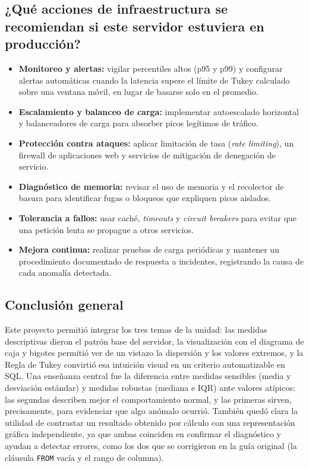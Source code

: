 \documentclass[12pt,letterpaper]{article}
\begin{document}
\subsection{¿Qué acciones de infraestructura se recomiendan si este servidor estuviera en producción?}
\begin{itemize}
    \item \textbf{Monitoreo y alertas:} vigilar percentiles altos (p95 y p99) y configurar alertas automáticas cuando la latencia supere el límite de Tukey calculado sobre una ventana móvil, en lugar de basarse solo en el promedio.
    \item \textbf{Escalamiento y balanceo de carga:} implementar autoescalado horizontal y balanceadores de carga para absorber picos legítimos de tráfico.
    \item \textbf{Protección contra ataques:} aplicar limitación de tasa (\textit{rate limiting}), un firewall de aplicaciones web y servicios de mitigación de denegación de servicio.
    \item \textbf{Diagnóstico de memoria:} revisar el uso de memoria y el recolector de basura para identificar fugas o bloqueos que expliquen picos aislados.
    \item \textbf{Tolerancia a fallos:} usar caché, \textit{timeouts} y \textit{circuit breakers} para evitar que una petición lenta se propague a otros servicios.
    \item \textbf{Mejora continua:} realizar pruebas de carga periódicas y mantener un procedimiento documentado de respuesta a incidentes, registrando la causa de cada anomalía detectada.
\end{itemize}
 
\subsection{Conclusión general}
Este proyecto permitió integrar los tres temas de la unidad: las medidas descriptivas dieron el patrón base del servidor, la visualización con el diagrama de caja y bigotes permitió ver de un vistazo la dispersión y los valores extremos, y la Regla de Tukey convirtió esa intuición visual en un criterio automatizable en SQL. Una enseñanza central fue la diferencia entre medidas sensibles (media y desviación estándar) y medidas robustas (mediana e IQR) ante valores atípicos: las segundas describen mejor el comportamiento normal, y las primeras sirven, precisamente, para evidenciar que algo anómalo ocurrió. También quedó clara la utilidad de contrastar un resultado obtenido por cálculo con una representación gráfica independiente, ya que ambas coinciden en confirmar el diagnóstico y ayudan a detectar errores, como los dos que se corrigieron en la guía original (la cláusula \texttt{FROM} vacía y el rango de columna).
 
\newpage
 


 
\end{document}
